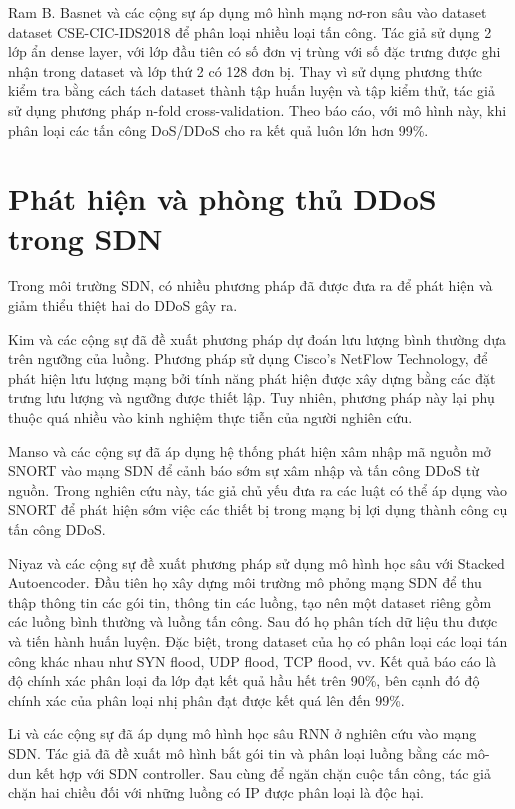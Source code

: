 Ram B. Basnet và các cộng sự \cite{61-Basnet} áp dụng mô hình mạng nơ-ron sâu vào dataset dataset CSE-CIC-IDS2018 để phân loại nhiều loại tấn công. Tác giả sử dụng 2 lớp ẩn dense layer, với lớp đầu tiên có số đơn vị trùng với số đặc trưng được ghi nhận trong dataset và lớp thứ 2 có 128 đơn bị. Thay vì sử dụng phương thức kiểm tra bằng cách tách dataset thành tập huấn luyện và tập kiểm thử, tác giả sử dụng phương pháp n-fold cross-validation. Theo báo cáo, với mô hình này, khi phân loại các tấn công DoS/DDoS cho ra kết quả luôn lớn hơn 99\%.

\section{Phát hiện và phòng thủ DDoS trong SDN}

Trong môi trường SDN, có nhiều phương pháp đã được đưa ra để phát hiện và giảm thiểu thiệt hai do DDoS gây ra.

Kim và các cộng sự \cite{52-Kim} đã đề xuất phương pháp dự đoán lưu lượng bình thường dựa trên ngưỡng của luồng. Phương pháp sử dụng Cisco’s NetFlow Technology, để phát hiện lưu lượng mạng bởi tính năng phát hiện được xây dựng bằng các đặt trưng lưu lượng và ngưỡng được thiết lập. Tuy nhiên, phương pháp này lại phụ thuộc quá nhiều vào kinh nghiệm thực tiễn của người nghiên cứu.

Manso và các cộng sự \cite{56-manso} đã áp dụng hệ thống phát hiện xâm nhập mã nguồn mở SNORT vào mạng SDN để cảnh báo sớm sự xâm nhập và tấn công DDoS từ nguồn. Trong nghiên cứu này, tác giả chủ yếu đưa ra các luật có thể áp dụng vào SNORT để phát hiện sớm việc các thiết bị trong mạng bị lợi dụng thành công cụ tấn công DDoS.

Niyaz và các cộng sự \cite{54-Niyaz} đề xuất phương pháp sử dụng mô hình học sâu với Stacked Autoencoder. Đầu tiên họ xây dựng môi trường mô phỏng mạng SDN để thu thập thông tin các gói tin, thông tin các luồng, tạo nên một dataset riêng gồm các luồng bình thường và luồng tấn công. Sau đó họ phân tích dữ liệu thu được và tiến hành huấn luyện. Đặc biệt, trong dataset của họ có phân loại các loại tán công khác nhau như SYN flood, UDP flood, TCP flood, vv. Kết quả báo cáo là độ chính xác phân loại đa lớp đạt kết quả hầu hết trên 90\%, bên cạnh đó độ chính xác của phân loại nhị phân đạt được kết quá lên đến 99\%.

Li và các cộng sự \cite{55-Li} đã áp dụng mô hình học sâu RNN ở nghiên cứu \cite{28-Yuan} vào mạng SDN. Tác giả đã đề xuất mô hình bắt gói tin và phân loại luồng bằng các mô-dun kết hợp với SDN controller. Sau cùng để ngăn chặn cuộc tấn công, tác giả chặn hai chiều đối với những luồng có IP được phân loại là độc hại.

